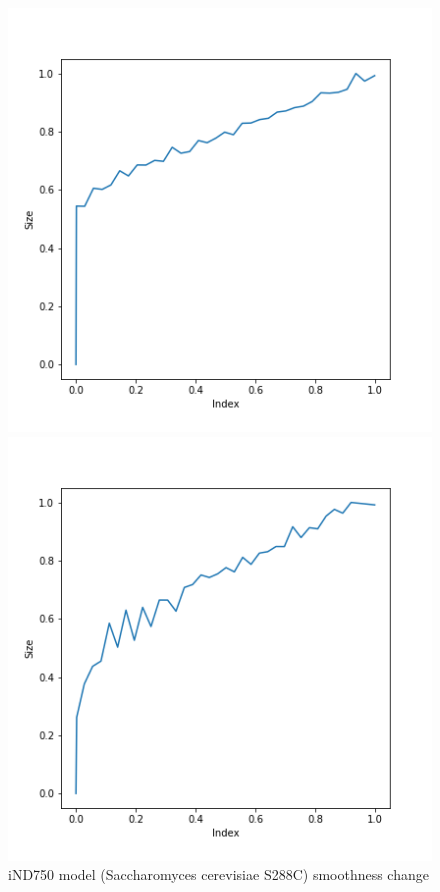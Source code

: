 \documentclass{article} %
\begin{document}
\begin{figure}[!htb]
  \includegraphics[width=\linewidth]{images/iND750-smoothness.png}
  \caption{iND750 model (Saccharomyces cerevisiae S288C) smoothness change}\label{fig:iND750-smoothness}
\endminipage\hfill
{}
  \includegraphics[width=\linewidth]{images/iAM_Pb448-smoothness.png}

\end{figure}
\end{document}
